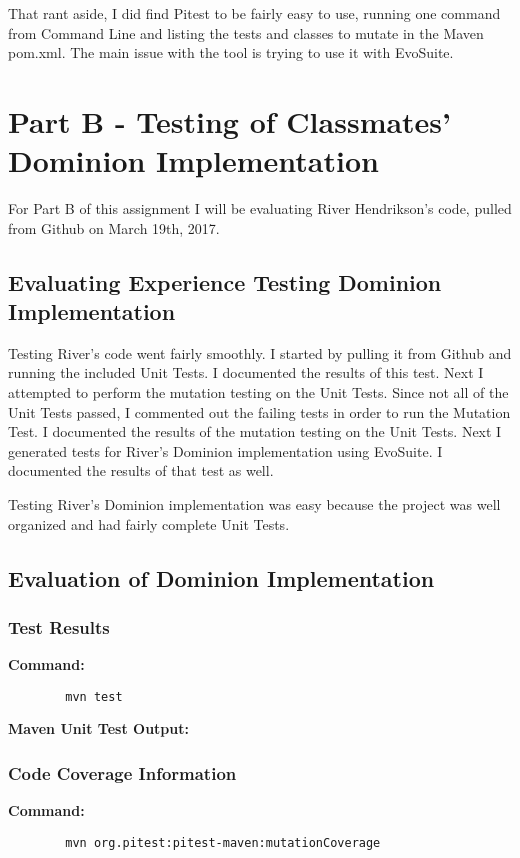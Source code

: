 \documentclass[letterpaper,10pt]{article}
\begin{document}
		That rant aside, I did find Pitest to be fairly easy to use, running one command from 
		Command Line and listing the tests and classes to mutate in the Maven pom.xml. The 
		main issue with the tool is trying to use it with EvoSuite.

\section{Part B - Testing of Classmates' Dominion Implementation}
For Part B of this assignment I will be evaluating River Hendrikson's code, pulled from Github 
on March 19th, 2017.
	\subsection{Evaluating Experience Testing Dominion Implementation}
	Testing River's code went fairly smoothly. I started by pulling it from Github and running
	 the included Unit Tests. I documented the results of this test. Next I attempted to 
	perform the mutation testing on the Unit Tests. Since not all of the Unit Tests passed, I 
	commented out the failing tests in order to run the Mutation Test. I documented the 
	results of the mutation testing on the Unit Tests. Next I generated tests for River's 
	Dominion implementation using EvoSuite. I documented the results of that test as well.

	Testing River's Dominion implementation was easy because the project was well organized 
	and had fairly complete Unit Tests.
	\subsection{Evaluation of Dominion Implementation}
		\subsubsection{Test Results}
		\textbf{Command:}
		\begin{lstlisting}
		mvn test
		\end{lstlisting}

		\textbf{Maven Unit Test Output:}
		

		\subsubsection{Code Coverage Information}
		\textbf{Command: }
		\begin{lstlisting}
		mvn org.pitest:pitest-maven:mutationCoverage
		\end{lstlisting}
\end{document}
